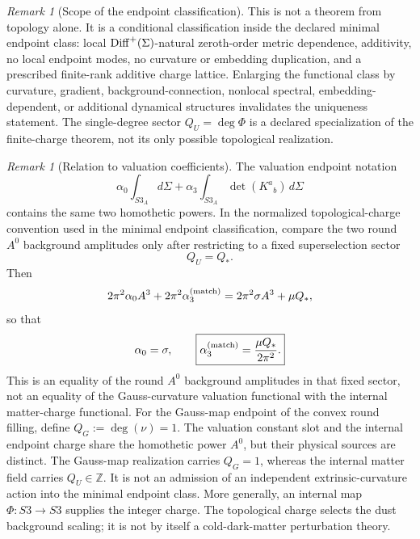 \documentclass[11pt,a4paper]{article}
\def\Sthree{S3}%
\def\dd{d}%
\def\QU{Q_U}%
\def\QG{Q_G}%
\numberwithin{equation}{section}
\theoremstyle{definition}
\theoremstyle{plain}
\theoremstyle{remark}
\newtheorem{remark}[criterion]{Remark}
\newcommand{\Sthree}{S^3}
\newcommand{\dd}{\mathrm{d}}
\newcommand{\QG}{Q_{\rm G}}
\newcommand{\QU}{Q_U}
\begin{document}
\begin{remark}[Scope of the endpoint classification]
This is not a theorem from topology alone. It is a conditional classification inside the declared minimal endpoint class: local \({\rm Diff}^{+}(\Sigma)\)-natural zeroth-order metric dependence, additivity, no local endpoint modes, no curvature or embedding duplication, and a prescribed finite-rank additive charge lattice. Enlarging the functional class by curvature, gradient, background-connection, nonlocal spectral, embedding-dependent, or additional dynamical structures invalidates the uniqueness statement. The single-degree sector \(\QU=\deg\Phi\) is a declared specialization of the finite-charge theorem, not its only possible topological realization.
\end{remark}

\begin{remark}[Relation to valuation coefficients]
The valuation endpoint notation
\begin{equation}
\alpha_0\int_{\Sthree_A}\dd\Sigma+
\alpha_3\int_{\Sthree_A}\det(K^a{}_b)\,\dd\Sigma
\end{equation}
contains the same two homothetic powers. In the normalized topological-charge convention used in the minimal endpoint classification, compare the two round \(A^0\) background amplitudes only after restricting to a fixed superselection sector
\begin{equation}
\QU=Q_*.
\end{equation}
Then
\begin{equation}
2\pi^2\alpha_0A^3+2\pi^2\alpha_3^{\rm(match)}
=2\pi^2\sigma A^3+\mu Q_*,
\end{equation}
so that
\begin{equation}
\alpha_0=\sigma,
\qquad
\boxed{
\alpha_3^{\rm(match)}=\frac{\mu Q_*}{2\pi^2}.
}
\end{equation}
This is an equality of the round \(A^0\) background amplitudes in that fixed sector, not an equality of the Gauss-curvature valuation functional with the internal matter-charge functional.
For the Gauss-map endpoint of the convex round filling, define \(\QG:=\deg(\nu)=1\). The valuation constant slot and the internal endpoint charge share the homothetic power \(A^0\), but their physical sources are distinct. The Gauss-map realization carries \(\QG=1\), whereas the internal matter field carries \(\QU\in\mathbb Z\). It is not an admission of an independent extrinsic-curvature action into the minimal endpoint class. More generally, an internal map \(\Phi:\Sthree\to\Sthree\) supplies the integer charge. The topological charge selects the dust background scaling; it is not by itself a cold-dark-matter perturbation theory.
\end{remark}
\end{document}
